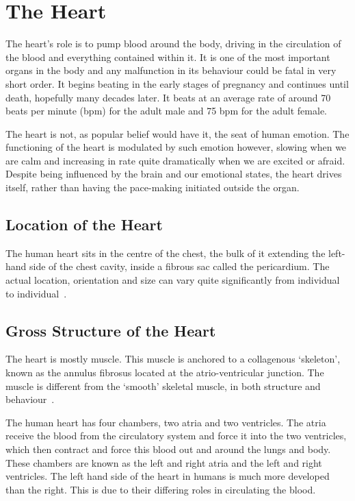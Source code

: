 \section{The Heart}

The heart's role is to pump blood around the body, driving in the circulation of
the blood and everything contained within it.  It is one of the most important
organs in the body and any malfunction in its behaviour could be fatal in very
short order.  It begins beating in the early stages of pregnancy and continues
until death, hopefully many decades later.  It beats at an average rate of
around 70 beats per minute (bpm) for the adult male and 75 bpm for the adult
female.

The heart is not, as popular belief would have it, the seat of human emotion.
The functioning of the heart is modulated by such emotion however, slowing when
we are calm and increasing in rate quite dramatically when we are excited or
afraid.  Despite being influenced by the brain and our emotional states, the
heart drives itself, rather than having the pace-making initiated outside the
organ.

\subsection{Location of the Heart}

The human heart sits in the centre of the chest, the bulk of it extending the
left-hand side of the chest cavity, inside a fibrous sac called the pericardium.
The actual location, orientation and size can vary quite significantly from
individual to individual~\cite{Oberman1967}.


\subsection{Gross Structure of the Heart}

The heart is mostly muscle.
This muscle is anchored to a collagenous `skeleton', known as the annulus
fibrosus located at the atrio-ventricular junction.
The muscle is different from the `smooth' skeletal muscle, in both structure
and behaviour~\cite{Katz2006}.

The human heart has four chambers, two atria and two ventricles.  The atria receive
the blood from the circulatory system and force it into the two ventricles,
which then contract and force this blood out and around the lungs and body.
These chambers are known as the left and right atria and the left and right
ventricles.  The left hand side of the heart in humans is much more developed
than the right.
This is due to their differing roles in circulating the blood.

